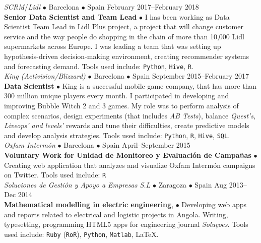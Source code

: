 \documentclass[a4paper, oneside]{scrreprt}
\begin{document}
\vspace{-0.3cm}
\noindent{}\textit{SCRM}/\textit{Lidl} $\bullet$ 
Barcelona $\bullet$ Spain \hfill February 2017--February 2018\\
\noindent\textbf{\small Senior Data Scientist and Team Lead} $\bullet$ 
{\small  I has been working as Data Scientist Team Lead in Lidl Plus project, a project that will
  change customer service and the way people do shopping in the chain of more
  than 10,000 Lidl supermarkets across Europe. I was leading a team that was
  setting up hypothesis-driven decision-making environment, creating recommender
  systems and forecasting demand. Tools used include: \texttt{Python}, \texttt{Hive}, \texttt{R}.
}\\

\vspace{-0.3cm}
\noindent{}
\hspace{-0.15cm}\textit{King (Activision/Blizzard)} $\bullet$ 
Barcelona $\bullet$ Spain \hfill September 2015--February 2017\\
\noindent\textbf{\small Data Scientist } $\bullet$ 
{\small King is a successful mobile game company, that has more
  than 300 million unique players every month. I participated in developing and
  improving Bubble Witch 2 and 3 games. My
  role was to perform analysis of complex scenarios,
  design experiments (that includes \textit{AB Tests}),
  balance \textit{Quest's, Liveops' and levels'}
  rewards and tune their difficulties,
  create predictive models and develop analysis strategies.
  Tools used include: \texttt{Python}, \texttt{R}, \texttt{Hive}, \texttt{SQL}. }\\

\vspace{-0.3cm}
\noindent{}\textit{Oxfam Intermón} $\bullet$ 
Barcelona $\bullet$ Spain \hfill April--September 2015\\
\noindent\textbf{\small Voluntary Work for Unidad de Monitoreo y Evaluación de Campañas} $\bullet$ 
{\small Creating web application that analyzes and visualize Oxfam Intermón
  campaigns on Twitter.  Tools used
  include: \texttt{R}}\\

\vspace{-0.3cm}
\noindent{}\textit{Soluciones de Gestión y Apoyo a Empresas S.L} 
$\bullet$ Zaragoza $\bullet$ Spain \hfill Aug 2013--Dec 2014\\
\noindent\textbf{\small Mathematical modelling in electric engineering}, $\bullet$ 
{\small Developing web apps and reports related to electrical and
  logistic projects in Angola.  Writing, typesetting, programming
  HTML5 apps for engineering journal \emph{Soluçoes}.  Tools used
  include:
  \texttt{Ruby} (\texttt{RoR}), \texttt{Python}, \texttt{Matlab}, \LaTeX.}\\
\end{document}
